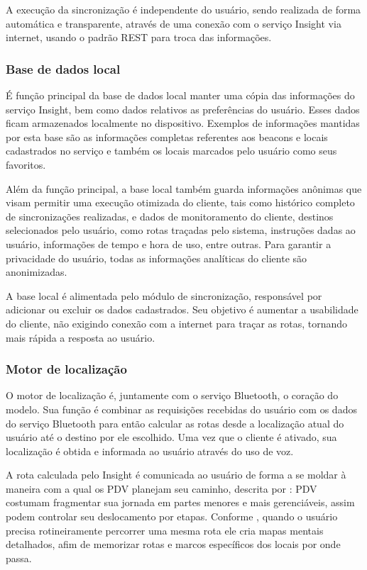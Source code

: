 \documentclass[english,brazilian]{UNISINOSmonografia}
\begin{document}
A execução da sincronização é independente do usuário, sendo realizada de forma automática e transparente, através de uma conexão com o serviço Insight via internet, usando o padrão REST para troca das informações.

		\subsubsection{Base de dados local}
É função principal da base de dados local manter uma cópia das informações do serviço Insight, bem como dados relativos as preferências do usuário. Esses dados ficam armazenados localmente no dispositivo. Exemplos de informações mantidas por esta base são as informações completas referentes aos beacons e locais cadastrados no serviço e também os locais marcados pelo usuário como seus favoritos.

Além da função principal, a base local também guarda informações anônimas que visam permitir uma execução otimizada do cliente, tais como histórico completo de sincronizações realizadas, e dados de monitoramento do cliente, destinos selecionados pelo usuário, como rotas traçadas pelo sistema, instruções dadas ao usuário, informações de tempo e hora de uso, entre outras. Para garantir a privacidade do usuário, todas as informações analíticas do cliente são anonimizadas.

A base local é alimentada pelo módulo de sincronização, responsável por adicionar ou excluir os dados cadastrados. Seu objetivo é aumentar a usabilidade do cliente, não exigindo conexão com a internet para traçar as rotas, tornando mais rápida a resposta ao usuário.

		\subsubsection{Motor de localização}
O motor de localização é, juntamente com o serviço Bluetooth, o coração do modelo. Sua função é combinar as requisições recebidas do usuário com os dados do serviço Bluetooth para então calcular as rotas desde a localização atual do usuário até o destino por ele escolhido. Uma vez que o cliente é ativado, sua localização é obtida e informada ao usuário através do uso de voz.

A rota calculada pelo Insight é comunicada ao usuário de forma a se moldar à maneira com a qual os PDV planejam seu caminho, descrita por : PDV costumam fragmentar sua jornada em partes menores e mais gerenciáveis, assim podem controlar seu deslocamento por etapas. Conforme , quando o usuário precisa rotineiramente percorrer uma mesma rota ele cria mapas mentais detalhados, afim de memorizar rotas e marcos específicos dos locais por onde passa. 
\end{document}
